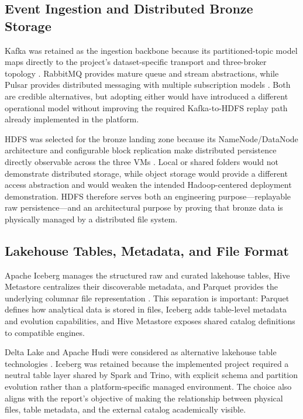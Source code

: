\subsection{Event Ingestion and Distributed Bronze Storage}
Kafka was retained as the ingestion backbone because its partitioned-topic model maps directly to the project's dataset-specific transport and three-broker topology \cite{apache_kafka_docs}. RabbitMQ provides mature queue and stream abstractions, while Pulsar provides distributed messaging with multiple subscription models \cite{rabbitmq_docs,apache_pulsar_docs}. Both are credible alternatives, but adopting either would have introduced a different operational model without improving the required Kafka-to-HDFS replay path already implemented in the platform.

HDFS was selected for the bronze landing zone because its NameNode/DataNode architecture and configurable block replication make distributed persistence directly observable across the three VMs \cite{apache_hadoop_docs}. Local or shared folders would not demonstrate distributed storage, while object storage would provide a different access abstraction and would weaken the intended Hadoop-centered deployment demonstration. HDFS therefore serves both an engineering purpose---replayable raw persistence---and an architectural purpose by proving that bronze data is physically managed by a distributed file system.

\subsection{Lakehouse Tables, Metadata, and File Format}
Apache Iceberg manages the structured raw and curated lakehouse tables, Hive Metastore centralizes their discoverable metadata, and Parquet provides the underlying columnar file representation \cite{apache_iceberg_docs,apache_hive_docs,apache_parquet_docs}. This separation is important: Parquet defines how analytical data is stored in files, Iceberg adds table-level metadata and evolution capabilities, and Hive Metastore exposes shared catalog definitions to compatible engines.

Delta Lake and Apache Hudi were considered as alternative lakehouse table technologies \cite{delta_lake_docs,apache_hudi_docs}. Iceberg was retained because the implemented project required a neutral table layer shared by Spark and Trino, with explicit schema and partition evolution rather than a platform-specific managed environment. The choice also aligns with the report's objective of making the relationship between physical files, table metadata, and the external catalog academically visible.

